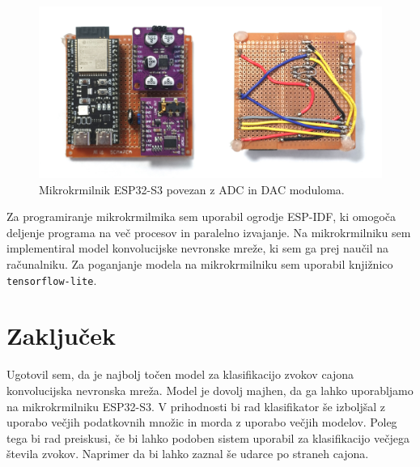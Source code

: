 \documentclass[11pt,a4paper]{article}
\begin{document}
\begin{figure}[h]
    \centering
    \includegraphics[width=\textwidth]{img/vezje.png}
    \caption{Mikrokrmilnik ESP32-S3 povezan z ADC in DAC moduloma.}
    \label{fig:vezje}
\end{figure}

Za programiranje mikrokrmilmika sem uporabil ogrodje ESP-IDF, ki omo\-go\-ča deljenje programa na več procesov in paralelno izvajanje. Na mikrokrmilniku sem implementiral model konvolucijske nevronske mreže, ki sem ga prej naučil na računalniku. Za poganjanje modela na mikrokrmilniku sem uporabil knjižnico \texttt{tensorflow-lite}.


\section*{Zaključek}

Ugotovil sem, da je najbolj točen model za klasifikacijo zvokov cajona konvolucijska nevronska mreža. Model je dovolj majhen, da ga lahko uporabljamo na mikrokrmilniku ESP32-S3. V prihodnosti bi rad klasifikator še izboljšal z uporabo večjih podatkovnih množic in morda z uporabo večjih modelov. Poleg tega bi rad preiskusi, če bi lahko podoben sistem uporabil za klasifikacijo večjega števila zvokov. Naprimer da bi lahko zaznal še udarce po straneh cajona.
\end{document}
